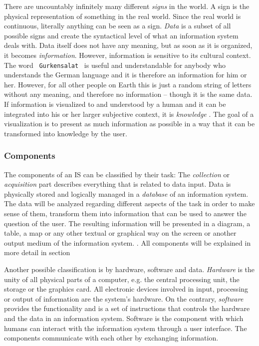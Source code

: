 There are uncountably infinitely many different \emph{signs} in the world. A sign is the physical representation of something in the real world. Since the real world is continuous, literally anything can be seen as a sign. \emph{Data} is a subset of all possible signs and create the syntactical level of what an information system deals with. Data itself does not have any meaning, but as soon as it is organized, it becomes \emph{information}. However, information is sensitive to its cultural context. The word ~\texttt{Gurkensalat}~ is useful and understandable for anybody who understands the German language and it is therefore an information for him or her. However, for all other people on Earth this is just a random string of letters without any meaning, and therefore no information -- though it is the same data. If information is visualized to and understood by a human and it can be integrated into his or her larger subjective context, it is \emph{knowledge} \cite{nake}. The goal of a visualization is to present as much information as possible in a way that it can be transformed into knowledge by the user.


\subsubsection{Components} %
\label{ssub:components_is}


The components of an IS can be classified by their task: The \emph{collection} or \emph{acquisition} part describes everything that is related to data input. Data is physically stored and logically managed in a \emph{database} of an information system. The data will be analyzed regarding different aspects of the task in order to make sense of them, transform them into information that can be used to answer the question of the user. The resulting information will be presented in a diagram, a table, a map or any other textual or graphical way on the screen or another output medium of the information system.
\cite{informationSystem}.
All components will be explained in more detail in section %

Another possible classification is by hardware, software and data. \emph{Hardware} is the unity of all physical parts of a computer, e.g. the central processing unit, the storage or the graphics card. All electronic devices involved in input, processing or output of information are the system's hardware. On the contrary, \emph{software} provides the functionality and is a set of instructions that controls the hardware and the data in an information system. Software is the component with which humans can interact with the information system through a user interface. The components communicate with each other by exchanging information.

